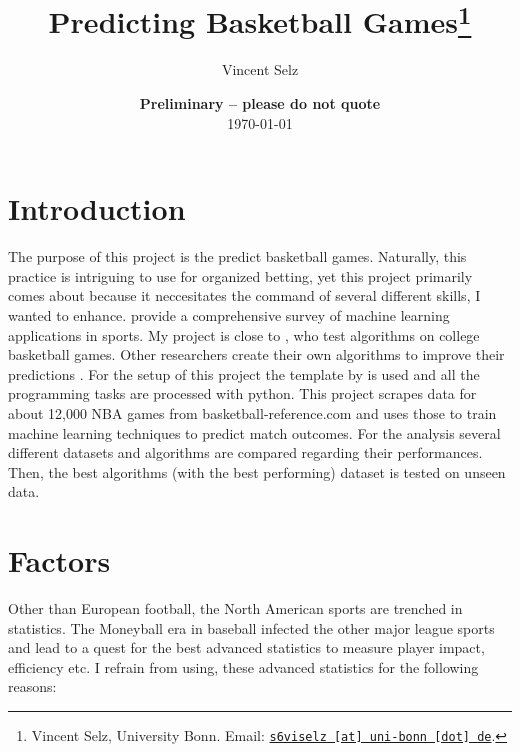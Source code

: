 \documentclass[11pt, a4paper, leqno]{article}
\begin{document}
\title{Predicting Basketball Games\thanks{Vincent Selz, University Bonn. Email: \href{mailto:s6viselz@uni-bonn.de}{\nolinkurl{s6viselz [at] uni-bonn [dot] de}}.}}

\author{Vincent Selz}

\date{
{\bf Preliminary -- please do not quote}
\\[1ex]
\today
}

\maketitle

\tableofcontents

\clearpage
\section{Introduction} %
\label{sec:introduction}

The purpose of this project is the predict basketball games. Naturally, this practice is intriguing to use for organized betting, yet this project primarily comes about because it neccesitates the command of several different skills, I wanted to enhance. \citet{survey} provide a comprehensive survey of machine learning applications in sports. My project is close to \citet{Zimbo}, who test algorithms on college basketball games. Other researchers create their own algorithms to improve their predictions \citep{Cascading}. For the setup of this project the template by \citet{GaudeckerEconProjectTemplates} is used and all the programming tasks are processed with python. This project scrapes data for about 12,000 NBA games from basketball-reference.com and uses those to train machine learning techniques to predict match outcomes. For the analysis several different datasets and algorithms are compared regarding their performances. Then, the best algorithms (with the best performing) dataset is tested on unseen data.

\section{Factors}


Other than European football, the North American sports are trenched in statistics. The Moneyball era in baseball infected the other major league sports and lead to a quest for the best advanced statistics to measure player impact, efficiency etc. I refrain from using, these advanced statistics for the following reasons:
\end{document}
